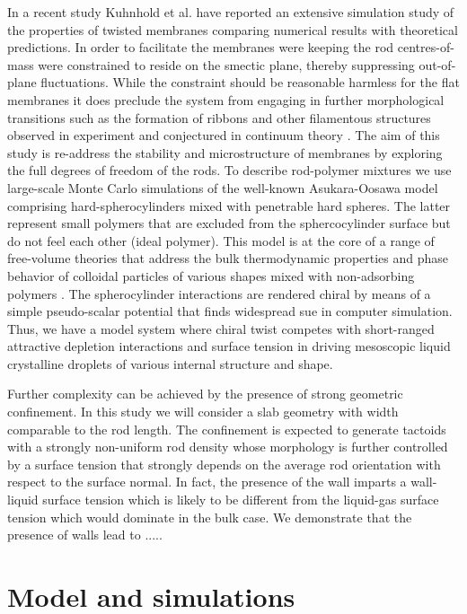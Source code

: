 In a recent study Kuhnhold et al. \cite{kuhnhold2022colloidal} have reported an extensive simulation study of the properties of twisted membranes comparing numerical results with theoretical predictions. In order to facilitate the membranes were keeping the rod centres-of-mass were constrained to reside on the smectic plane, thereby suppressing out-of-plane fluctuations. While the constraint should be reasonable harmless for the flat membranes it does preclude the system from engaging in further morphological transitions such as the formation of ribbons and other filamentous structures observed in experiment \cite{Gibaud2014} and conjectured in continuum theory \cite{kaplan2010theory,kang_sm2016}. The aim of this study is re-address the stability and microstructure of membranes by exploring the full degrees of freedom of the rods. To describe rod-polymer mixtures we use large-scale Monte Carlo simulations of the well-known Asukara-Oosawa model comprising hard-spherocylinders mixed with penetrable hard spheres. The latter represent small polymers that are excluded from the sphercocylinder surface but do not feel each other (ideal polymer). This model is at the core of a range of free-volume theories that address the bulk thermodynamic properties and phase behavior of colloidal particles of  various shapes mixed with non-adsorbing polymers \cite{lektuin2011}. The spherocylinder interactions are rendered chiral by means of a simple pseudo-scalar potential that finds widespread sue in computer simulation. Thus, we have a model system where chiral twist competes with short-ranged attractive depletion interactions and surface tension in driving mesoscopic liquid crystalline droplets of various internal structure and shape.  


Further complexity can be achieved by the presence of strong geometric confinement.  In this study we will consider a slab geometry with width comparable to the rod length. The confinement is expected to generate tactoids with a strongly non-uniform rod density whose morphology is further controlled by a surface tension that strongly depends on the average rod orientation with respect to the surface normal. In fact, the presence of the wall imparts a wall-liquid surface tension which is likely to be different from the liquid-gas surface tension which would dominate in the bulk case. We demonstrate that the presence of walls lead to .....



\section{Model and simulations}

